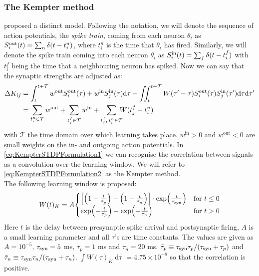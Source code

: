 \subsubsection{The Kempter method}
\cite{Kempter1999} proposed a distinct \STDP model. Following the notation, we will denote the sequence of action potentials, the \textsl{spike train}, coming from each neuron $\theta_i$ as $S_i^{\rm out}(t) = \sum_{n} \delta (t-t_{i}^{n})$, where $t_{i}^{n}$ is the time that $\theta_i$ has fired. Similarly, we will denote the spike train coming into each neuron $\theta_i$ as $S_i^{\rm in}(t) = \sum_{f} \delta (t-t_{i}^{f})$ with $t_{i}^{f}$ being the time that a neighbouring neuron has spiked. Now we can say that the synaptic strengths are adjusted as:
\begin{align}
\Delta K_{ij} &= \int_{t}^{t+\mathcal{T}} w^{\rm{out}} S_i^{\rm out}(\tau) + w^{\rm{in}} S_{j}^{\rm {in}}(\tau) \mathrm{d}\tau
+ \iint_{t}^{t+\mathcal{T}} W( \tau^\prime - \tau) S_{i}^{\rm out}(\tau) S_{j}^{\rm in}( \tau^\prime) \mathrm{d} \tau \mathrm{d} \tau^\prime
\label{eq:KempterSTDPFormulation1} \\
&= \sum_{t_i^{n}\in \mathcal{T}} w^{\mathrm{out}} + \sum_{t_{j}^{f} \in \mathcal{T}} w^{\mathrm{in}} + \sum_{t_{j}^{f}, \: t_i^{n} \in \mathcal{T}} \hspace{-2mm} W (t_{j}^{f}-t_i^{n} ) \label{eq:KempterSTDPFormulation2}
\end{align}
with $\mathcal{T}$ the time domain over which learning takes place. $w^{\mathrm{in}} > 0$ and $w^{\mathrm{out}} < 0$ are small weights on the in- and outgoing action potentials. In \eqref{eq:KempterSTDPFormulation1} we can recognise the correlation between signals as a convolution over the learning window. We will refer to \eqref{eq:KempterSTDPFormulation2} as the Kempter method. \\

The following learning window is proposed:
\begin{align}
W(t)_K = A
\begin{cases}
\left[\left(1-\frac{t}{\tilde{\tau}_{p}}\right) - \left(1-\frac{t}{\tilde{\tau}_{n}}\right)\right] \cdot \exp \left( \frac{t}{\tau_{\rm syn}} \right) & \text{for } t \leq 0 \\
 \exp \left(-\frac{t}{\tau_{p}}\right) - \exp \left(-\frac{t}{\tau_{n}} \right) & \text{for } t > 0
\end{cases} \label{eq:learningwindowKempter1999}
\end{align}
Here $t$ is the delay between presynaptic spike arrival and postsynaptic firing, $A$ is a small learning parameter and all $\tau$'s are time constants. The values are given as $A = 10^{-5}$, $\tau_{\rm syn} = 5$ ms, $\tau_{p} = 1$ ms and $\tau_{n} = 20$ ms. $\tilde{\tau}_{p} \equiv \tau_{\rm syn} \tau_{p} / (\tau_{\rm syn} + \tau_{p})$ and $\tilde{\tau}_{n} \equiv \tau_{\rm syn} \tau_{n} / (\tau_{\rm syn} + \tau_{n})$. $\int W(\tau)_K \mathop{d \tau} = 4.75 \times 10^{-8}$ so that the correlation is positive. \\

